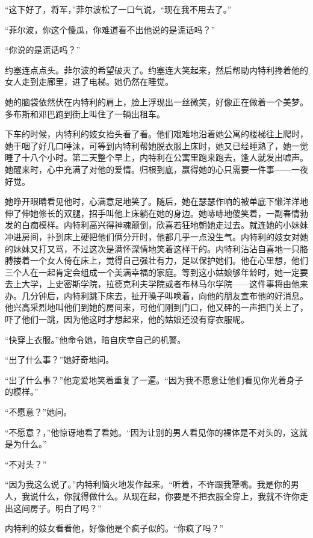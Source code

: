     “这下好了，将军，”菲尔波松了一口气说，“现在我不用去了。”

    “菲尔波，你这个傻瓜，你难道看不出他说的是谎话吗？”

    “你说的是谎话吗？”

    约塞连点点头。菲尔波的希望破灭了。约塞连大笑起来，然后帮助内特利搀着他的女人走到走廊里，进了电梯。她仍然在睡觉。

    她的脑袋依然伏在内特利的肩上，脸上浮现出一丝微笑，好像正在做着一个美梦。多布斯和邓巴跑到街上叫住了一辆出租车。
 


    下车的时候，内特利的妓女抬头看了看。他们艰难地沿着她公寓的楼梯往上爬时，她干咽了好几口唾沫，可等到内特利帮她脱衣服上床时，她又已经睡熟了，她一觉睡了十八个小时。第二天整个早上，内特利在公寓里跑来跑去，逢人就发出嘘声。她醒来时，心中充满了对他的爱情。归根到底，赢得她的心只需要一件事——一夜好觉。

    她睁开眼睛看见他时，心满意足地笑了。随后，她在瑟瑟作响的被单底下懒洋洋地伸了伸她修长的双腿，招手叫他上床躺在她的身边。她哧哧地傻笑着，一副春情勃发的白痴模样。内特利高兴得神魂颠倒，欣喜若狂地朝她走过去。就连她的小妹妹冲进房间，扑到床上硬把他们俩分开时，他都几乎一点没生气。内特利的妓女对她的妹妹又打又骂，不过这次是满怀深情地笑着这样干的。内特利沾沾自喜地一只胳膊搂着一个女人倚在床上，觉得自己强壮有力，足以保护她们。他在心里想，他们三个人在一起肯定会组成一个美满幸福的家庭。等到这小姑娘够年龄时，她一定要去上大学，上史密斯学院，拉德克利夫学院或者布林马尔学院——这件事将由他来办。几分钟后，内特利跳下床去，扯开嗓子叫唤着，向他的朋友宣布他的好消息。他兴高采烈地叫他们到她的房间来，可他们刚到门口，他又砰的一声把门关上了，吓了他们一跳，因为他这时才想起来，他的姑娘还没有穿衣服呢。

    “快穿上衣服。”他命令她，暗自庆幸自己的机警。

    “出了什么事？”她好奇地问。

    “出了什么事？”他宠爱地笑着重复了一遍。“因为我不愿意让他们看见你光着身子的模样。”

    “不愿意？”她问。

    “不愿意？，”他惊讶地看了看她。“因为让别的男人看见你的裸体是不对头的，这就是为什么。”

    “不对头？”

    “因为我这么说了。”内特利恼火地发作起来。“听着，不许跟我犟嘴。我是你的男人，我说什么，你就得做什么。从现在起，你要是不把衣服全穿上，我就不许你走出这间房子。明白了吗？”

    内特利的妓女看看他，好像他是个疯子似的。“你疯了吗？”

